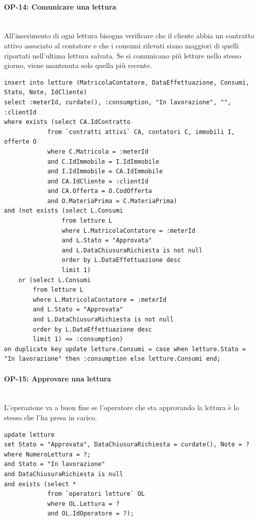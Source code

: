 \documentclass[a4paper,12pt]{report}
\begin{document}
\paragraph{OP-14: Comunicare una lettura}\mbox{}\\
All'inserimento di ogni lettura bisogna verificare che il cliente abbia un contratto attivo associato al contatore e che i consumi rilevati siano maggiori di quelli riportati nell'ultima lettura salvata. Se si comunicano più letture nello stesso giorno, viene mantenuta solo quella più recente.
\begin{lstlisting}
insert into letture (MatricolaContatore, DataEffettuazione, Consumi, Stato, Note, IdCliente)
select :meterId, curdate(), :consumption, "In lavorazione", "", :clientId
where exists (select CA.IdContratto
            from `contratti attivi` CA, contatori C, immobili I, offerte O
            where C.Matricola = :meterId
            and C.IdImmobile = I.IdImmobile
            and I.IdImmobile = CA.IdImmobile
            and CA.IdCliente = :clientId
            and CA.Offerta = O.CodOfferta
            and O.MateriaPrima = C.MateriaPrima)
and (not exists (select L.Consumi
                from letture L
                where L.MatricolaContatore = :meterId
                and L.Stato = "Approvata"
                and L.DataChiusuraRichiesta is not null
                order by L.DataEffettuazione desc
                limit 1)
    or (select L.Consumi
        from letture L
        where L.MatricolaContatore = :meterId
        and L.Stato = "Approvata"
        and L.DataChiusuraRichiesta is not null
        order by L.DataEffettuazione desc
        limit 1) <= :consumption)
on duplicate key update letture.Consumi = case when letture.Stato = "In lavorazione" then :consumption else letture.Consumi end;
\end{lstlisting}

\paragraph{OP-15: Approvare una lettura}\mbox{}\\
L'operazione va a buon fine se l'operatore che sta approvando la lettura è lo stesso che l'ha presa in carico.
\begin{lstlisting}
update letture
set Stato = "Approvata", DataChiusuraRichiesta = curdate(), Note = ?
where NumeroLettura = ?;
and Stato = "In lavorazione"
and DataChiusuraRichiesta is null
and exists (select *
            from `operatori letture` OL
            where OL.Lettura = ?
            and OL.IdOperatore = ?);
\end{lstlisting}
\end{document}
